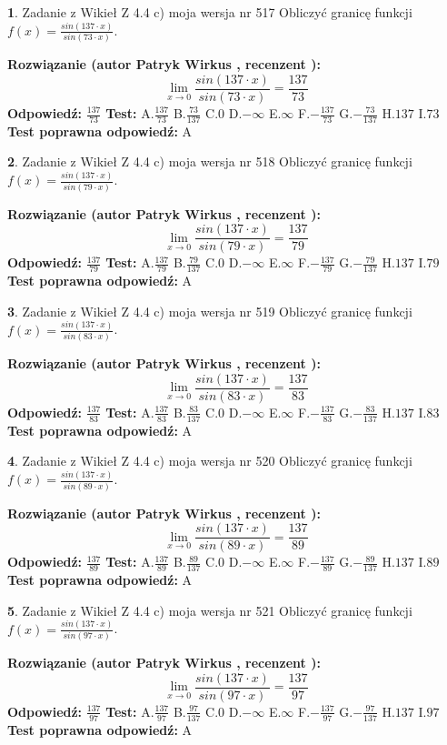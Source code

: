 \documentclass[12pt, a4paper]{article}
\theoremstyle{definition} %
\newtheorem{zad}{}
\newcommand{\zadStart}[1]{\begin{zad}#1\newline}
\newcommand{\zadStop}{\end{zad}}
\newcommand{\rozwStart}[2]{\noindent \textbf{Rozwiązanie (autor #1 , recenzent #2): }\newline}
\newcommand{\rozwStop}{\newline}
\newcommand{\odpStart}{\noindent \textbf{Odpowiedź:}\newline}
\newcommand{\odpStop}{\newline}
\newcommand{\testStart}{\noindent \textbf{Test:}\newline}
\newcommand{\testStop}{\newline}
\newcommand{\kluczStart}{\noindent \textbf{Test poprawna odpowiedź:}\newline}
\newcommand{\kluczStop}{\newline}
\begin{document}
\zadStart{Zadanie z Wikieł Z 4.4 c) moja wersja nr 517}
Obliczyć granicę funkcji $f(x)=\frac{sin(137\cdot x)}{sin(73\cdot x)}$.
\zadStop
\rozwStart{Patryk Wirkus}{}
$$\lim\limits_{x\to 0}\frac{sin(137\cdot x)}{sin(73\cdot x)}=
\frac{137}{73}$$
\rozwStop
\odpStart
$\frac{137}{73}$
\odpStop
\testStart
A.$\frac{137}{73}$
B.$\frac{73}{137}$
C.$0$
D.$-\infty$
E.$\infty$
F.$-\frac{137}{73}$
G.$-\frac{73}{137}$
H.$137$
I.$73$
\testStop
\kluczStart
A
\kluczStop



\zadStart{Zadanie z Wikieł Z 4.4 c) moja wersja nr 518}
Obliczyć granicę funkcji $f(x)=\frac{sin(137\cdot x)}{sin(79\cdot x)}$.
\zadStop
\rozwStart{Patryk Wirkus}{}
$$\lim\limits_{x\to 0}\frac{sin(137\cdot x)}{sin(79\cdot x)}=
\frac{137}{79}$$
\rozwStop
\odpStart
$\frac{137}{79}$
\odpStop
\testStart
A.$\frac{137}{79}$
B.$\frac{79}{137}$
C.$0$
D.$-\infty$
E.$\infty$
F.$-\frac{137}{79}$
G.$-\frac{79}{137}$
H.$137$
I.$79$
\testStop
\kluczStart
A
\kluczStop



\zadStart{Zadanie z Wikieł Z 4.4 c) moja wersja nr 519}
Obliczyć granicę funkcji $f(x)=\frac{sin(137\cdot x)}{sin(83\cdot x)}$.
\zadStop
\rozwStart{Patryk Wirkus}{}
$$\lim\limits_{x\to 0}\frac{sin(137\cdot x)}{sin(83\cdot x)}=
\frac{137}{83}$$
\rozwStop
\odpStart
$\frac{137}{83}$
\odpStop
\testStart
A.$\frac{137}{83}$
B.$\frac{83}{137}$
C.$0$
D.$-\infty$
E.$\infty$
F.$-\frac{137}{83}$
G.$-\frac{83}{137}$
H.$137$
I.$83$
\testStop
\kluczStart
A
\kluczStop



\zadStart{Zadanie z Wikieł Z 4.4 c) moja wersja nr 520}
Obliczyć granicę funkcji $f(x)=\frac{sin(137\cdot x)}{sin(89\cdot x)}$.
\zadStop
\rozwStart{Patryk Wirkus}{}
$$\lim\limits_{x\to 0}\frac{sin(137\cdot x)}{sin(89\cdot x)}=
\frac{137}{89}$$
\rozwStop
\odpStart
$\frac{137}{89}$
\odpStop
\testStart
A.$\frac{137}{89}$
B.$\frac{89}{137}$
C.$0$
D.$-\infty$
E.$\infty$
F.$-\frac{137}{89}$
G.$-\frac{89}{137}$
H.$137$
I.$89$
\testStop
\kluczStart
A
\kluczStop



\zadStart{Zadanie z Wikieł Z 4.4 c) moja wersja nr 521}
Obliczyć granicę funkcji $f(x)=\frac{sin(137\cdot x)}{sin(97\cdot x)}$.
\zadStop
\rozwStart{Patryk Wirkus}{}
$$\lim\limits_{x\to 0}\frac{sin(137\cdot x)}{sin(97\cdot x)}=
\frac{137}{97}$$
\rozwStop
\odpStart
$\frac{137}{97}$
\odpStop
\testStart
A.$\frac{137}{97}$
B.$\frac{97}{137}$
C.$0$
D.$-\infty$
E.$\infty$
F.$-\frac{137}{97}$
G.$-\frac{97}{137}$
H.$137$
I.$97$
\testStop
\kluczStart
A
\kluczStop
\end{document}

